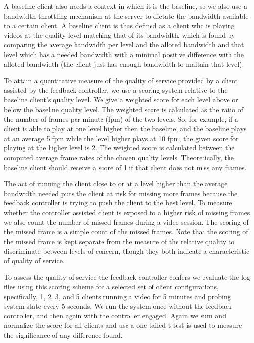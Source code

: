 \documentclass{sig-alternate}
\begin{document}
A baseline client also needs a context in which it is the baseline, so
we also use a bandwidth throttling mechanism \cite{SHAPERD} at the
server to dictate the bandwidth available to a certain client.  A
baseline client is thus defined as a client who is playing videos at
the quality level matching that of its bandwidth, which is found by
comparing the average bandwidth per level and the alloted bandwidth
and that level which has a needed bandwidth with a minimal positive
difference with the alloted bandwidth (the client just has enough
bandwidth to maitain that level).

To attain a quantitative measure of the quality of service provided by
a client assisted by the feedback controller, we use a scoring system
relative to the baseline client's quality level.  We give a weighted
score for each level above or below the baseline quality level.  The
weighted score is calculated as the ratio of the number of frames per
minute (fpm) of the two levels.  So, for example, if a client is able
to play at one level higher then the baseline, and the baseline plays
at an average 5 fpm while the level higher plays at 10 fpm, the given
score for playing at the higher level is 2.  The weighted score is
calculated between the computed average frame rates of the chosen
quality levels.  Theoretically, the baseline client should receive a
score of 1 if that client does not miss any frames.

The act of running the client close to or at a level higher than the
average bandwidth needed puts the client at risk for missing more
frames because the feedback controller is trying to push the client to
the best level.  To measure whether the controller assisted client is
exposed to a higher risk of missing frames we also count the number of
missed frames during a video session.  The scoring of the missed frame
is a simple count of the missed frames.  Note that the scoring of the
missed frame is kept separate from the measure of the relative quality
to discriminate between levels of concern, though they both indicate a
characteristic of quality of service.

To assess the quality of service the feedback controller confers we
evaluate the log files using this scoring scheme for a selected set of
client configurations, specifically, 1, 2, 3, and 5 clients running a
video for 5 minutes and probing system state every 5 seconds.  We run
the system once without the feedback controller, and then again with
the controller engaged.  Again we sum and normalize the score for all
clients and use a one-tailed t-test is used to measure the
significance of any difference found.
\end{document}
